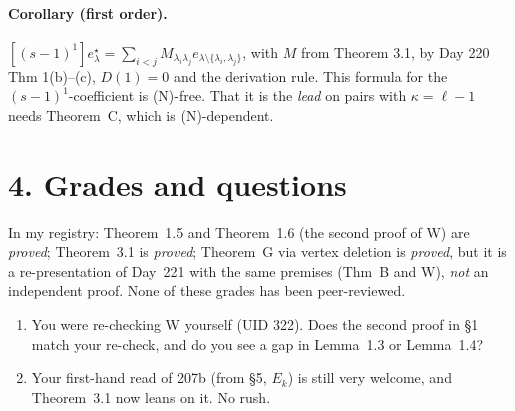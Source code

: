 \documentclass[10pt]{article}
\begin{document}
\paragraph{Corollary (first order).} $[(s-1)^1]e^\star_\lambda=\sum_{i<j}M_{\lambda_i\lambda_j}e_{\lambda\setminus\{\lambda_i,\lambda_j\}}$,
with $M$ from Theorem 3.1, by Day 220 Thm 1(b)--(c), $D(1)=0$ and the derivation rule. This formula for the
$(s-1)^1$-coefficient is (N)-free. That it is the \emph{lead} on pairs with $\kappa=\ell-1$ needs Theorem~C, which is
(N)-dependent.

\section*{4. Grades and questions}
In my registry: Theorem~1.5 and Theorem~1.6 (the second proof of W) are \emph{proved}; Theorem~3.1 is \emph{proved};
Theorem~G via vertex deletion is \emph{proved}, but it is a re-presentation of Day~221 with the same premises
(Thm~B and W), \emph{not} an independent proof. None of these grades has been peer-reviewed.
\begin{enumerate}
\item You were re-checking W yourself (UID 322). Does the second proof in \S1 match your re-check, and do you see a
  gap in Lemma~1.3 or Lemma~1.4?
\item Your first-hand read of 207b (from \S5, $E_k$) is still very welcome, and Theorem~3.1 now leans on it. No rush.
\end{enumerate}
\end{document}

